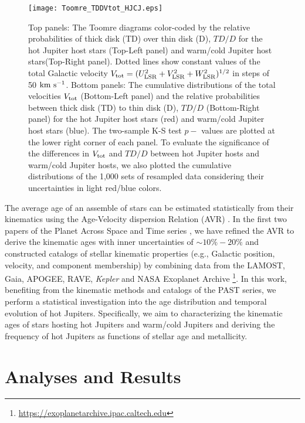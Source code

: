 \documentclass[twocolumn]{pnas-new}
\begin{document}
\begin{figure*}[!t]
\centering
\texttt{[image: Toomre\_TDDVtot\_HJCJ.eps]}
\caption{
Top panels: {The Toomre diagrams color-coded by the relative probabilities of thick disk (TD) over thin disk (D), $TD/D$} for the hot Jupiter host stars (Top-Left panel) and warm/cold Jupiter host stars(Top-Right panel).
Dotted lines show constant values of the total  Galactic velocity $V_{\rm tot} = (U_{\rm LSR}^2+V_{\rm LSR}^2+W_{\rm LSR}^2)^{1/2}$ in steps of 50 $\rm km \ s^{-1}$.
Bottom panels: The cumulative distributions of the total velocities $V_{\rm tot}$ (Bottom-Left panel) and the relative probabilities between thick disk (TD) to thin disk (D), $TD/D$ (Bottom-Right panel) for the hot Jupiter host stars (red) and warm/cold Jupiter host stars (blue).
The two-sample K-S test $p-$ values are plotted at the lower right corner of each panel.
{To evaluate the significance of the differences in $V_{\rm tot}$ and $TD/D$ between hot Jupiter hosts and warm/cold Jupiter hosts, we also plotted the cumulative distributions of the 1,000 sets of resampled data considering their uncertainties in light red/blue colors.}
\label{figToomrediagramVtotTDDHJCJ}}
\end{figure*}

The average age of an assemble of stars can be estimated statistically from their kinematics using the Age-Velocity dispersion Relation (AVR) \citep[e.g.,][]{1977A&A....60..263W,2009A&A...501..941H}. In the first two papers of the Planet Across Space and Time series \citep[hereafter referred to as PAST \uppercase\expandafter{} and \uppercase\expandafter{};][]{2021ApJ...909..115C,2022AJ....163..249C},
we have refined the AVR to derive the kinematic ages with inner uncertainties of $\sim 10\%-20\%$ and constructed catalogs of stellar kinematic properties (e.g., Galactic position, velocity, and component membership) by combining data from the LAMOST, Gaia, APOGEE, RAVE, {\it Kepler} and NASA Exoplanet Archive \footnote{\url{https://exoplanetarchive.ipac.caltech.edu}}.
In this work, benefiting from the kinematic methods and catalogs of the PAST series, we perform a statistical investigation into the age distribution and temporal evolution of hot Jupiters. {Specifically, we aim to characterizing the kinematic ages of stars hosting hot Jupiters and warm/cold Jupiters and deriving the frequency of hot Jupiters as functions of stellar age and metallicity. }



\section*{Analyses and Results}
\end{document}
